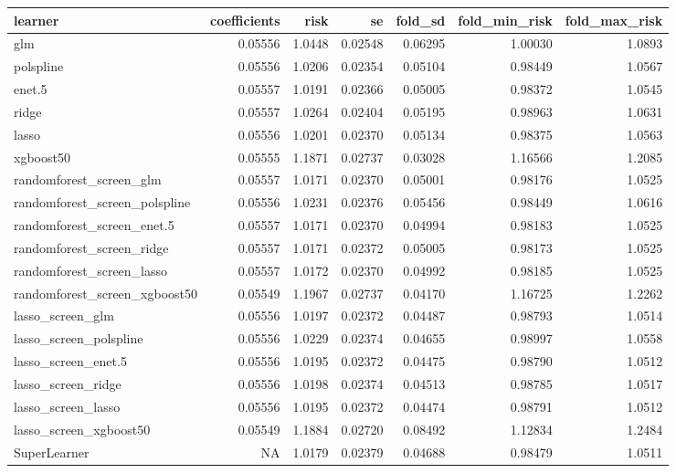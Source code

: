 \documentclass[
  12pt, krantz2,
]{book}
\theoremstyle{definition}
\theoremstyle{definition}
\theoremstyle{definition}
\newcommand{\1}{\mathbbm{1}}
\begin{document}
\begin{tabular}{l|r|r|r|r|r|r}
\hline
learner & coefficients & risk & se & fold\_sd & fold\_min\_risk & fold\_max\_risk\\
\hline
glm & 0.05556 & 1.0448 & 0.02548 & 0.06295 & 1.00030 & 1.0893\\
\hline
polspline & 0.05556 & 1.0206 & 0.02354 & 0.05104 & 0.98449 & 1.0567\\
\hline
enet.5 & 0.05557 & 1.0191 & 0.02366 & 0.05005 & 0.98372 & 1.0545\\
\hline
ridge & 0.05557 & 1.0264 & 0.02404 & 0.05195 & 0.98963 & 1.0631\\
\hline
lasso & 0.05556 & 1.0201 & 0.02370 & 0.05134 & 0.98375 & 1.0563\\
\hline
xgboost50 & 0.05555 & 1.1871 & 0.02737 & 0.03028 & 1.16566 & 1.2085\\
\hline
randomforest\_screen\_glm & 0.05557 & 1.0171 & 0.02370 & 0.05001 & 0.98176 & 1.0525\\
\hline
randomforest\_screen\_polspline & 0.05556 & 1.0231 & 0.02376 & 0.05456 & 0.98449 & 1.0616\\
\hline
randomforest\_screen\_enet.5 & 0.05557 & 1.0171 & 0.02370 & 0.04994 & 0.98183 & 1.0525\\
\hline
randomforest\_screen\_ridge & 0.05557 & 1.0171 & 0.02372 & 0.05005 & 0.98173 & 1.0525\\
\hline
randomforest\_screen\_lasso & 0.05557 & 1.0172 & 0.02370 & 0.04992 & 0.98185 & 1.0525\\
\hline
randomforest\_screen\_xgboost50 & 0.05549 & 1.1967 & 0.02737 & 0.04170 & 1.16725 & 1.2262\\
\hline
lasso\_screen\_glm & 0.05556 & 1.0197 & 0.02372 & 0.04487 & 0.98793 & 1.0514\\
\hline
lasso\_screen\_polspline & 0.05556 & 1.0229 & 0.02374 & 0.04655 & 0.98997 & 1.0558\\
\hline
lasso\_screen\_enet.5 & 0.05556 & 1.0195 & 0.02372 & 0.04475 & 0.98790 & 1.0512\\
\hline
lasso\_screen\_ridge & 0.05556 & 1.0198 & 0.02374 & 0.04513 & 0.98785 & 1.0517\\
\hline
lasso\_screen\_lasso & 0.05556 & 1.0195 & 0.02372 & 0.04474 & 0.98791 & 1.0512\\
\hline
lasso\_screen\_xgboost50 & 0.05549 & 1.1884 & 0.02720 & 0.08492 & 1.12834 & 1.2484\\
\hline
SuperLearner & NA & 1.0179 & 0.02379 & 0.04688 & 0.98479 & 1.0511\\
\hline
\end{tabular}
\end{document}
